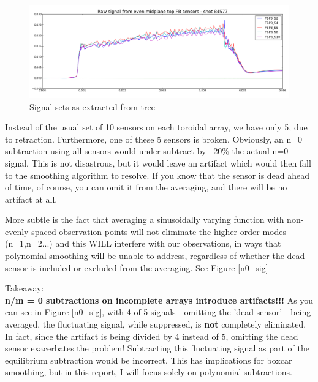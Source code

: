 \documentclass{article}
\begin{document}
\par
\begin{figure}[h!]
\includegraphics[width = \textwidth]{./Report_pic_raw_sig.png}\caption{Signal sets as extracted from tree}
\label{raw_sig}
\end{figure}
Instead of the usual set of 10 sensors on each toroidal array, we have only 5, due to retraction.  Furthermore, one of these 5 sensors is broken.  Obviously, an n=0 subtraction using all sensors would under-subtract by ~20\% the actual n=0 signal.   This is not disastrous, but it would leave an artifact which would then fall to the smoothing algorithm to resolve.  If you know that the sensor is dead ahead of time, of course, you can omit it from the averaging, and there will be no artifact at all.
\par
More subtle is the fact that averaging a sinusoidally varying function with non-evenly spaced observation points will not eliminate the higher order modes (n=1,n=2...) and this WILL interfere with our observations, in ways that polynomial smoothing will be unable to address, regardless of whether the dead sensor is included or excluded from the averaging.  See Figure \ref{n0_sig}\par
Takeaway:\\
\textbf{n/m = 0 subtractions on incomplete arrays introduce artifacts!!!}
\newpage
As you can see in Figure \ref{n0_sig}, with 4 of 5 signals - omitting the 'dead sensor' - being averaged, the fluctuating signal, while suppressed, is \textbf{not} completely eliminated.  In fact, since the artifact is being divided by 4 instead of 5, omitting the dead sensor exacerbates the problem! Subtracting this fluctuating signal as part of the equilibrium subtraction would be incorrect.  This has implications for boxcar smoothing, but in this report, I will focus solely on polynomial subtractions.
\end{document}
